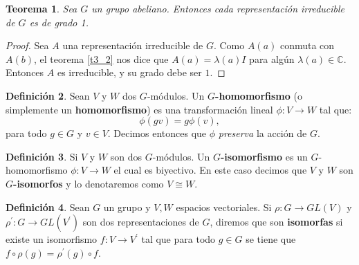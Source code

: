 \documentclass[12pt]{book}
\newtheorem{theorem}{Teorema}[section]
\theoremstyle{definition}
\newtheorem{definition}[theorem]{Definición}
\newcounter{in}
\newcounter{ini}
\begin{document}
\begin{theorem}
  \label{t3_3}
  Sea $G$ un grupo abeliano. Entonces cada
representación irreducible de $G$ es de grado 1.
\end{theorem}

\begin{proof}
  Sea $A$ una representación irreducible de $G$. Como $A(a)$ conmuta
con $A(b)$, el teorema \ref{t3_2} nos dice que $A(a)=\lambda(a) I$
para algún $\lambda(a) \in \mathbb{C}$. Entonces $A$ es irreducible, y
su grado debe ser $1$.
\end{proof}

\begin{mdframed}
\begin{definition}
  Sean $V$ y $W$ dos $G$-módulos. Un $G$\textbf{-homomorfismo} (o
simplemente un \textbf{homomorfismo}) es una transformación lineal
$\phi:V\rightarrow W$ tal que:
  \begin{equation*}
    \phi(gv)=g\phi(v),
  \end{equation*}
para todo $g\in G$ y $v\in V$. Decimos entonces que $\phi$
\emph{preserva} la acción de $G$.
\end{definition}

\begin{definition}
  Si $V$ y $W$ son dos $G$-módulos. Un $G$\textbf{-isomorfismo} es un
  $G$-homomorfismo $\phi:V\rightarrow W$ el cual es biyectivo. En
  este caso decimos que $V$ y $W$ son $G$\textbf{-isomorfos} y lo
  denotaremos como $V\cong W$.
\end{definition}

\begin{definition}
  Sean $G$ un grupo y $V,W$ espacios vectoriales. Si
$\rho:G\rightarrow GL(V)$ y $\rho^{'}:G\rightarrow GL(V^{'})$ son dos
representaciones de $G$, diremos que son \textbf{isomorfas} si existe
un isomorfismo $f:V\rightarrow V^{'}$ tal que para todo $g\in G$ se
tiene que $f\circ\rho(g)=\rho^{'}(g)\circ f$.
\end{definition}


\end{mdframed}
\end{document}
